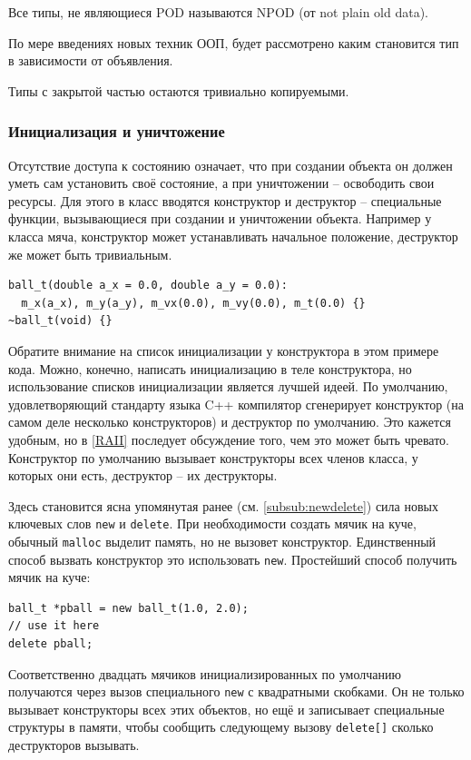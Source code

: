\documentclass[a4paper,12pt,oneside]{article}
\begin{document}
Все типы, не являющиеся POD называются NPOD (от not plain old data).

По мере введениях новых техник ООП, будет рассмотрено каким становится тип в зависимости от объявления.

Типы с закрытой частью остаются тривиально копируемыми.

\subsubsection{Инициализация и уничтожение}\label{subsub:constrdestr}

Отсутствие доступа к состоянию означает, что при создании объекта он должен уметь сам установить своё состояние, а при уничтожении – освободить свои ресурсы. Для этого в класс вводятся конструктор и деструктор – специальные функции, вызывающиеся при создании и уничтожении объекта. Например у класса мяча, конструктор может устанавливать начальное положение, деструктор же может быть тривиальным.

\begin{lstlisting}
ball_t(double a_x = 0.0, double a_y = 0.0):
  m_x(a_x), m_y(a_y), m_vx(0.0), m_vy(0.0), m_t(0.0) {}
~ball_t(void) {}
\end{lstlisting}

Обратите внимание на список инициализации у конструктора в этом примере кода. Можно, конечно, написать инициализацию в теле конструктора, но использование списков инициализации является лучшей идеей. По умолчанию, удовлетворяющий стандарту языка C++ компилятор сгенерирует конструктор (на самом деле несколько конструкторов) и деструктор по умолчанию. Это кажется удобным, но в \ref{RAII} последует обсуждение того, чем это может быть чревато. Конструктор по умолчанию вызывает конструкторы всех членов класса, у которых они есть, деструктор -- их деструкторы.

Здесь становится ясна упомянутая ранее (см. \ref{subsub:newdelete}) сила новых ключевых слов \lstinline!new! и \lstinline!delete!. При необходимости создать мячик на куче, обычный \lstinline!malloc! выделит память, но не вызовет конструктор. Единственный способ вызвать конструктор это использовать \lstinline!new!. Простейший способ получить мячик на куче:

\begin{lstlisting}
ball_t *pball = new ball_t(1.0, 2.0);
// use it here
delete pball;
\end{lstlisting}

Соответственно двадцать мячиков инициализированных по умолчанию получаются через вызов специального \lstinline!new! с квадратными скобками. Он не только вызывает конструкторы всех этих объектов, но ещё и записывает специальные структуры в памяти, чтобы сообщить следующему вызову \lstinline!delete[]! сколько деструкторов вызывать.
\end{document}
